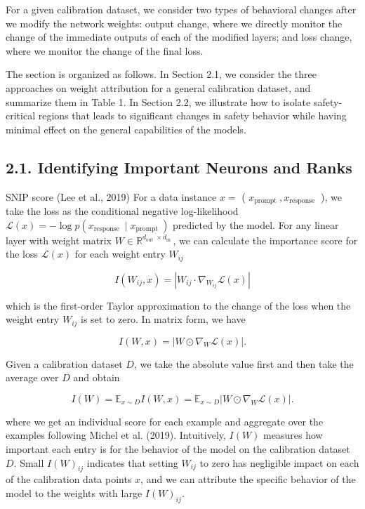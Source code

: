 \documentclass[10pt]{article}
\begin{document}
For a given calibration dataset, we consider two types of behavioral changes after we modify the network weights: output change, where we directly monitor the change of the immediate outputs of each of the modified layers; and loss change, where we monitor the change of the final loss.

The section is organized as follows. In Section 2.1, we consider the three approaches on weight attribution for a general calibration dataset, and summarize them in Table 1. In Section 2.2, we illustrate how to isolate safety-critical regions that leads to significant changes in safety behavior while having minimal effect on the general capabilities of the models.

\subsection*{2.1. Identifying Important Neurons and Ranks}
SNIP score (Lee et al., 2019) For a data instance $x=$ ( $x_{\text {prompt }}, x_{\text {response }}$ ), we take the loss as the conditional negative log-likelihood $\mathcal{L}(x)=-\log p\left(x_{\text {response }} \mid x_{\text {prompt }}\right)$ predicted by the model. For any linear layer with weight matrix $W \in \mathbb{R}^{d_{\text {out }} \times d_{\text {in }}}$, we can calculate the importance score for the loss $\mathcal{L}(x)$ for each weight entry $W_{i j}$

$$
I\left(W_{i j}, x\right)=\left|W_{i j} \cdot \nabla_{W_{i j}} \mathcal{L}(x)\right|
$$

which is the first-order Taylor approximation to the change of the loss when the weight entry $W_{i j}$ is set to zero. In matrix form, we have

$$
I(W, x)=\left|W \odot \nabla_{W} \mathcal{L}(x)\right| .
$$

Given a calibration dataset $D$, we take the absolute value first and then take the average over $D$ and obtain

$$
I(W)=\mathbb{E}_{x \sim D} I(W, x)=\mathbb{E}_{x \sim D}\left|W \odot \nabla_{W} \mathcal{L}(x)\right| .
$$

where we get an individual score for each example and aggregate over the examples following Michel et al. (2019). Intuitively, $I(W)$ measures how important each entry is for the behavior of the model on the calibration dataset $D$. Small $I(W)_{i j}$ indicates that setting $W_{i j}$ to zero has negligible impact on each of the calibration data points $x$, and we can attribute the specific behavior of the model to the weights with large $I(W)_{i j}$.
\end{document}
